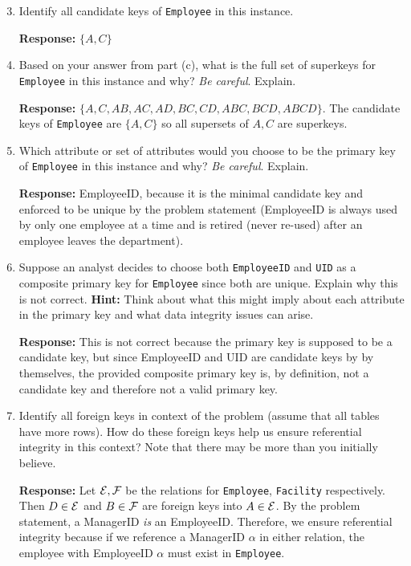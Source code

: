 \documentclass{report}
\renewcommand{\it}[1]{\textit{{#1}}}
\renewcommand{\bf}[1]{\textbf{{#1}}}
\renewcommand{\tt}[1]{\texttt{{#1}}}
\begin{document}
\begin{enumerate}[label=(\alph*)]
    \setcounter{enumi}{2}
    \item Identify all candidate keys of \tt{Employee} in this instance. \vspace{2pt}

        \bf{Response:} $\{A, C\}$

    \item Based on your answer from part (c), what is the full set of superkeys for
        \tt{Employee} in this instance and why? \it{Be careful}. Explain. \vspace{2pt}

        \bf{Response:} $\{A, C, AB, AC, AD, BC, CD, ABC, BCD, ABCD\}$. The candidate keys of \tt{Employee} are
        $\{A, C\}$ so all supersets of $A, C$ are superkeys.

    \item Which attribute or set of attributes would you choose to be the primary key of 
        \tt{Employee} in this instance and why? \it{Be careful}. Explain. \vspace{2pt}

        \bf{Response:} EmployeeID, because it is the minimal candidate key and enforced to
        be unique by the problem statement (EmployeeID is always used by only one employee at a time 
        and is retired (never re-used) after an employee leaves the department).


    \item Suppose an analyst decides to choose both \tt{EmployeeID} and \tt{UID} 
        as a composite primary key for \tt{Employee} since both are unique. Explain why 
        this is not correct. \bf{Hint:} Think about what this might imply about each 
        attribute in the primary key and what data integrity issues can arise. \vspace{2pt}

        \bf{Response:} This is not correct because the primary key is supposed to be a candidate key, 
        but since EmployeeID and UID are candidate keys by by themselves, the provided composite 
        primary key is, by definition, not a candidate key and therefore not a valid primary key. 

    \item Identify all foreign keys in context of the problem (assume that all tables have more 
        rows). How do these foreign keys help us ensure referential integrity in this context? Note 
        that there may be more than you initially believe. \vspace{2pt}

        \bf{Response:} Let $\cal{E}, \cal{F}$ be the relations for \tt{Employee}, \tt{Facility} 
        respectively. Then $D \in \cal{E}$ and $B \in \cal{F}$ are foreign keys into $A \in \cal{E}$.
        By the problem statement, a ManagerID \it{is} an EmployeeID. Therefore, we ensure referential
        integrity because if we reference a ManagerID $\alpha$ in either relation, the employee 
        with EmployeeID $\alpha$ must exist in \tt{Employee}.
\end{enumerate}
\end{document}
